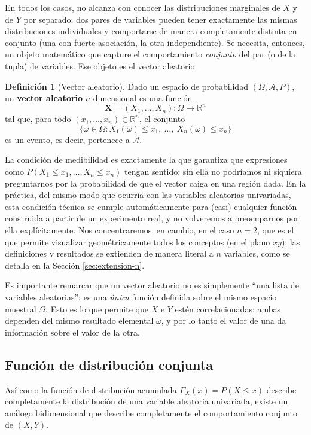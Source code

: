 \documentclass[11pt,a4paper]{article}
\theoremstyle{plain}
\theoremstyle{definition}
\newtheorem{definicion}[teorema]{Definición}
\theoremstyle{remark}
\begin{document}
En todos los casos, no alcanza con conocer las distribuciones marginales de $X$ y de $Y$ por separado: dos pares de variables pueden tener exactamente las mismas distribuciones individuales y comportarse de manera completamente distinta en conjunto (una con fuerte asociación, la otra independiente). Se necesita, entonces, un objeto matemático que capture el comportamiento \emph{conjunto} del par (o de la tupla) de variables. Ese objeto es el vector aleatorio.

\begin{definicion}[Vector aleatorio]
Dado un espacio de probabilidad $(\Omega,\mathcal A, P)$, un \textbf{vector aleatorio} $n$-dimensional es una función
\[
\mathbf X = (X_1,\dots,X_n): \Omega \longrightarrow \mathbb R^n
\]
tal que, para todo $(x_1,\dots,x_n)\in\mathbb R^n$, el conjunto
\[
\{\omega\in\Omega : X_1(\omega)\le x_1,\ \dots,\ X_n(\omega)\le x_n\}
\]
es un evento, es decir, pertenece a $\mathcal A$.
\end{definicion}

La condición de medibilidad es exactamente la que garantiza que expresiones como $P(X_1\le x_1,\dots,X_n\le x_n)$ tengan sentido: sin ella no podríamos ni siquiera preguntarnos por la probabilidad de que el vector caiga en una región dada. En la práctica, del mismo modo que ocurría con las variables aleatorias univariadas, esta condición técnica se cumple automáticamente para (casi) cualquier función construida a partir de un experimento real, y no volveremos a preocuparnos por ella explícitamente. Nos concentraremos, en cambio, en el caso $n=2$, que es el que permite visualizar geométricamente todos los conceptos (en el plano $xy$); las definiciones y resultados se extienden de manera literal a $n$ variables, como se detalla en la Sección \ref{sec:extension-n}.

Es importante remarcar que un vector aleatorio no es simplemente ``una lista de variables aleatorias'': es una \emph{única} función definida sobre el mismo espacio muestral $\Omega$. Esto es lo que permite que $X$ e $Y$ estén correlacionadas: ambas dependen del mismo resultado elemental $\omega$, y por lo tanto el valor de una da información sobre el valor de la otra.

\subsection{Función de distribución conjunta}

Así como la función de distribución acumulada $F_X(x) = P(X\le x)$ describe completamente la distribución de una variable aleatoria univariada, existe un análogo bidimensional que describe completamente el comportamiento conjunto de $(X,Y)$.
\end{document}
